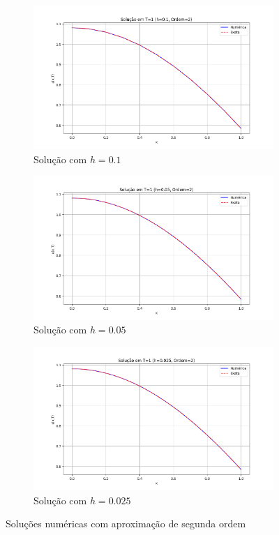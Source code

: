 \documentclass[column,amsmath,amssymb,floatfix]{revtex4}
\begin{document}
\begin{figure}[H]
 \centering
 \begin{subfigure}{0.35\textwidth}
     \includegraphics[width=\textwidth]{img/ex0104.png}
     \caption{Solução com $h=0.1$}
     \label{fig:ex1_4}
 \end{subfigure}
 \begin{subfigure}{0.35\textwidth}
     \includegraphics[width=\textwidth]{img/ex0105.png}
     \caption{Solução com $h=0.05$}
     \label{fig:ex1_5}
 \end{subfigure}
 \begin{subfigure}{0.35\textwidth}
     \includegraphics[width=\textwidth]{img/ex0106.png}
     \caption{Solução com $h=0.025$}
     \label{fig:ex1_6}
 \end{subfigure}
 \caption{Soluções numéricas com aproximação de segunda ordem}
 \label{fig:ex1_ord2}
\end{figure}
\end{document}

